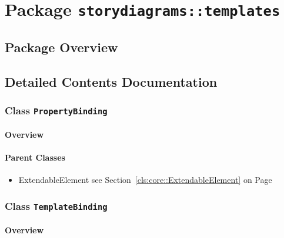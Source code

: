 \section{Package \bfseries \texttt{storydiagrams::templates}\normalfont}
\subsection{Package Overview}
	
			
		



\subsection{Detailed Contents Documentation}
\subsubsection{\Large{Class \bfseries \texttt{PropertyBinding}\normalfont}}
\label{cls:storydiagrams::templates::PropertyBinding} 
\paragraph{Overview}

	



\paragraph{Parent Classes}
\begin{itemize}
\item ExtendableElement see Section~\ref{cls:core::ExtendableElement} on Page~\pageref{cls:core::ExtendableElement}\end{itemize}
\subsubsection{\Large{Class \bfseries \texttt{TemplateBinding}\normalfont}}
\label{cls:storydiagrams::templates::TemplateBinding} 
\paragraph{Overview}

